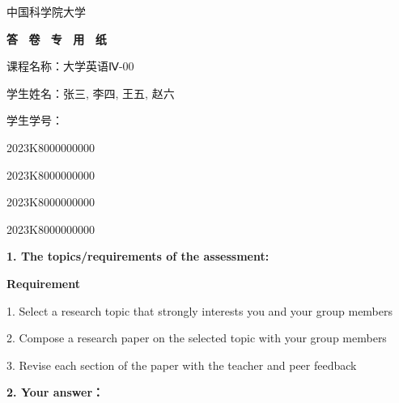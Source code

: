 \documentclass[12pt]{article}
\begin{document}
\begin{minipage}[t]{0.38\textwidth}
    \vspace{-0.7cm}
    \begin{center}
        {

        { \hwxk 中国科学院大学}

        \vspace{10pt}

        { \textbf{答 \ 卷 \ 专 \ 用 \ 纸}}}
    \end{center}
\end{minipage}
\hspace{3em}
\begin{minipage}[t]{0.6\textwidth}
    \vspace{-0.7cm}
    \fontsize{12.045pt}{14.46pt} \hwzs
    课程名称：大学英语{\hwzseng Ⅳ-00}

    \vspace{0.3em}

    学生姓名：张三, 李四, 王五, 赵六
    \vspace{0.3em}

    学生学号：{\hwzseng2023K8000000000

    \hspace{4.7em} 2023K8000000000

    \hspace{4.7em} 2023K8000000000
    
    \hspace{4.7em} 2023K8000000000}
    \vspace{0.3em}

\end{minipage}

\begin{center}
\end{center}

\vspace{-0.4cm}

\begin{flushleft}
    {\calibri \textbf{1. The topics/requirements of the assessment:}}

    {\cambria \textbf{Requirement}

    1. Select a research topic that strongly interests you and your group members

    2. Compose a research paper on the selected topic with your group members

    3. Revise each section of the paper with the teacher and peer feedback}
    \newline

    \textbf{2. Your answer：}
\end{flushleft}
\end{document}
